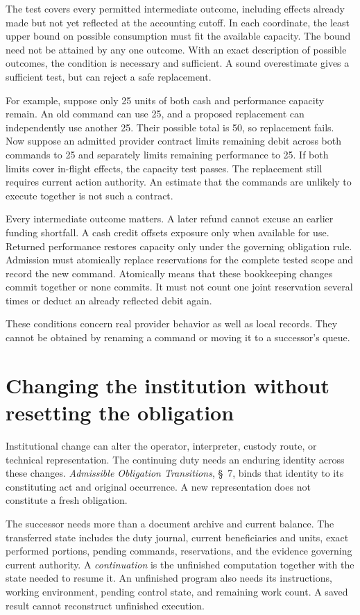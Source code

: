 \documentclass{momentum}
\begin{document}
The test covers every permitted intermediate outcome, including effects already made but not yet reflected at the accounting cutoff. In each coordinate, the least upper bound on possible consumption must fit the available capacity. The bound need not be attained by any one outcome. With an exact description of possible outcomes, the condition is necessary and sufficient. A sound overestimate gives a sufficient test, but can reject a safe replacement.

For example, suppose only 25 units of both cash and performance capacity remain. An old command can use 25, and a proposed replacement can independently use another 25. Their possible total is 50, so replacement fails. Now suppose an admitted provider contract limits remaining debit across both commands to 25 and separately limits remaining performance to 25. If both limits cover in-flight effects, the capacity test passes. The replacement still requires current action authority. An estimate that the commands are unlikely to execute together is not such a contract.

Every intermediate outcome matters. A later refund cannot excuse an earlier funding shortfall. A cash credit offsets exposure only when available for use. Returned performance restores capacity only under the governing obligation rule. Admission must atomically replace reservations for the complete tested scope and record the new command. Atomically means that these bookkeeping changes commit together or none commits. It must not count one joint reservation several times or deduct an already reflected debit again.

These conditions concern real provider behavior as well as local records. They cannot be obtained by renaming a command or moving it to a successor's queue.

\section{Changing the institution without resetting the obligation}

Institutional change can alter the operator, interpreter, custody route, or technical representation. The continuing duty needs an enduring identity across these changes. \emph{Admissible Obligation Transitions}, \S~7, binds that identity to its constituting act and original occurrence. A new representation does not constitute a fresh obligation.

The successor needs more than a document archive and current balance. The transferred state includes the duty journal, current beneficiaries and units, exact performed portions, pending commands, reservations, and the evidence governing current authority. A \emph{continuation} is the unfinished computation together with the state needed to resume it. An unfinished program also needs its instructions, working environment, pending control state, and remaining work count. A saved result cannot reconstruct unfinished execution.
\end{document}
